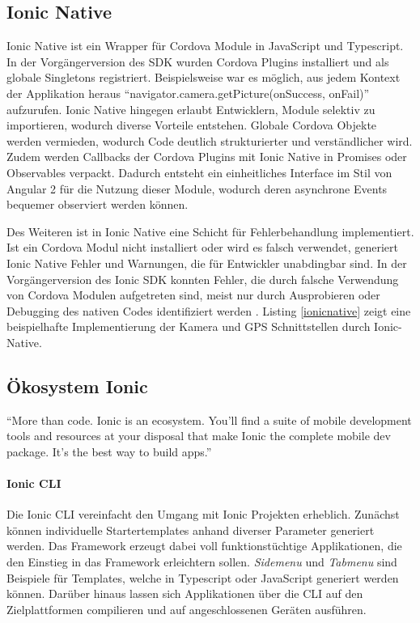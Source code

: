 \subsection{Ionic Native}

Ionic Native ist ein Wrapper für Cordova Module in JavaScript und Typescript.
In der Vorgängerversion des \ac{SDK} wurden Cordova Plugins installiert und als globale Singletons registriert.
Beispielsweise war es möglich, aus jedem Kontext der Applikation heraus ``navigator.camera.getPicture(onSuccess, onFail)'' aufzurufen.
Ionic Native hingegen erlaubt Entwicklern, Module selektiv zu importieren, wodurch diverse Vorteile entstehen.
Globale Cordova Objekte werden vermieden, wodurch Code deutlich strukturierter und verständlicher wird.
Zudem werden Callbacks der Cordova Plugins mit Ionic Native in Promises oder Observables verpackt.
Dadurch entsteht ein einheitliches Interface im Stil von Angular 2 für die Nutzung dieser Module,
wodurch deren asynchrone Events bequemer observiert werden können.

Des Weiteren ist in Ionic Native eine Schicht für Fehlerbehandlung implementiert.
Ist ein Cordova Modul nicht installiert oder wird es falsch verwendet,
generiert Ionic Native Fehler und Warnungen, die für Entwickler unabdingbar sind.
In der Vorgängerversion des Ionic \ac{SDK} konnten Fehler, die durch falsche Verwendung von
Cordova Modulen aufgetreten sind, meist nur durch Ausprobieren oder Debugging des nativen Codes identifiziert werden
\cite{ionic55:online}.
Listing \ref{ionicnative} zeigt eine beispielhafte Implementierung der Kamera und GPS Schnittstellen durch Ionic-Native.

\vspace{0.3cm}



\subsection{Ökosystem Ionic}

``More than code. Ionic is an ecosystem. You'll find a suite of mobile development tools and resources at your disposal that make
Ionic the complete mobile dev package. It's the best way to build apps.'' \cite{Ionic20:online}
\vspace{0.3cm}

\paragraph{Ionic \ac{CLI}}
Die Ionic \ac{CLI} vereinfacht den Umgang mit Ionic Projekten erheblich. Zunächst können individuelle
Startertemplates anhand diverser Parameter generiert werden.
Das Framework erzeugt dabei voll funktionstüchtige Applikationen, die den Einstieg in das Framework erleichtern sollen.
\emph{Sidemenu} und \emph{Tabmenu} sind Beispiele für Templates, welche in Typescript oder JavaScript generiert werden können.
Darüber hinaus lassen sich Applikationen über die \ac{CLI} auf den Zielplattformen compilieren und auf angeschlossenen Geräten ausführen.

